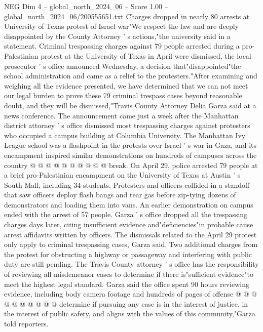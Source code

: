 \begin{textsample}{NEG Dim 4 – global\_north\_2024\_06 – Score 1.00 – global\_north\_2024\_06/200555651.txt}  \label{ex:f4_neg_311}
Charges dropped in nearly 80 arrests at University of Texas protest of Israel war"We respect the law and are deeply disappointed by the County Attorney ' s actions,"the university said in a statement.
Criminal trespassing charges against 79 people arrested during a pro-Palestinian protest at the University of Texas in April were dismissed, the local prosecutor ' s office announced Wednesday, a decision that"disappointed"the school administration and came as a relief to the protesters."After examining and weighing all the evidence presented, we have determined that we can not meet our legal burden to prove these 79 criminal trespass cases beyond reasonable doubt, and they will be dismissed,"Travis County Attorney Delia Garza said at a news conference.
The announcement came just a week after the Manhattan district attorney ' s office dismissed most trespassing charges against protesters who occupied a campus building at Columbia University.
The Manhattan Ivy League school was a flashpoint in the protests over Israel ' s war in Gaza, and its encampment inspired similar demonstrations on hundreds of campuses across the country @ @ @ @ @ @ @ @ @ @ break.
On April 29, police arrested 79 people at a brief pro-Palestinian encampment on the University of Texas at Austin ' s South Mall, including 34 students.
Protesters and officers collided in a standoff that saw officers deploy flash bangs and tear gas before zip-tying dozens of demonstrators and loading them into vans.
An earlier demonstration on campus ended with the arrest of 57 people.
Garza ' s office dropped all the trespassing charges days later, citing insufficient evidence and"deficiencies"in probable cause arrest affidavits written by officers.
The dismissals related to the April 29 protest only apply to criminal trespassing cases, Garza said.
Two additional charges from the protest for obstructing a highway or passageway and interfering with public duty are still pending.
The Travis County attorney ' s office has the responsibility of reviewing all misdemeanor cases to determine if there is"sufficient evidence"to meet the highest legal standard.
Garza said the office spent 90 hours reviewing evidence, including body camera footage and hundreds of pages of offense @ @ @ @ @ @ @ @ @ @ determine if pursuing any case is in the interest of justice, in the interest of public safety, and aligns with the values of this community,"Garza told reporters.

\end{textsample}
